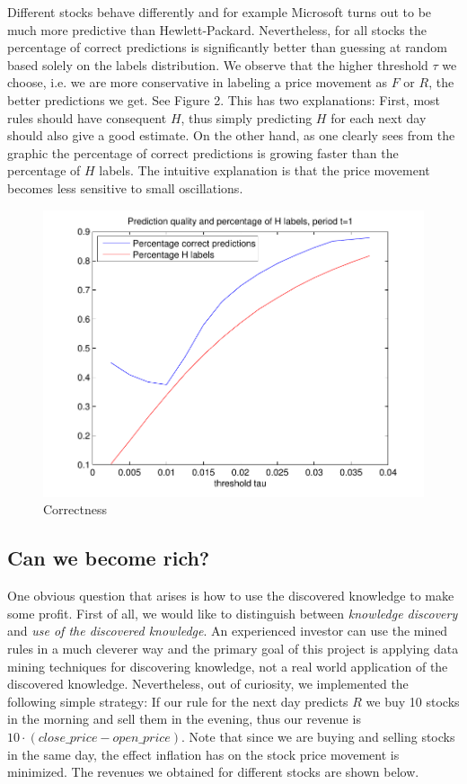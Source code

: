 \documentclass[10pt]{article}
\begin{document}
Different stocks behave differently and for example Microsoft turns out to be
much more predictive than Hewlett-Packard. Nevertheless, for all stocks the
percentage of correct predictions is significantly better than guessing at
random based solely on the labels distribution.  We observe that the higher
threshold $\tau$ we choose, i.e. we are more conservative in labeling a price
movement as $F$ or $R$, the better predictions we get. See Figure 2. This has
two explanations: First, most rules should have consequent $H$, thus simply
predicting $H$ for each next day should also give a good estimate. On the other
hand, as one clearly sees from the graphic the percentage of correct
predictions is growing faster than the percentage of $H$ labels. The intuitive
explanation is that the price movement becomes less sensitive to small
oscillations.
\begin{figure}[htb!]
\caption{Correctness}
\centering%
\includegraphics[scale=0.7]{corr.pdf}
\end{figure}
\subsection{Can we become rich?}
One obvious question that arises is how to use the discovered knowledge to make
some profit. First of all, we would like to distinguish between {\em knowledge
discovery} and {\em use of the discovered knowledge}. An experienced investor
can use the mined rules in a much cleverer way and the primary goal of this
project is applying data mining techniques for discovering knowledge, not a
real world application of the discovered knowledge. Nevertheless, out of
curiosity, we implemented the following simple strategy: If our rule for the
next day predicts $R$ we buy 10 stocks in the morning and sell them in the
evening, thus our revenue is $10\cdot (close\_price - open\_price)$. Note that
since we are buying and selling stocks in the same day, the effect inflation
has on the stock price movement is minimized.  The revenues we obtained for
different stocks are shown below.
\end{document}
